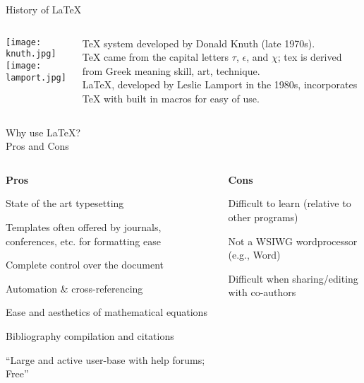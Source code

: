 \documentclass[xcolor=dvipsnames]{beamer}
\begin{document}
\begin{frame}{\LARGE{History of \LaTeX}}
\begin{columns}
\begin{column}{.25\textwidth}
	\texttt{[image: knuth.jpg]}\\
	\texttt{[image: lamport.jpg]}
\end{column}
\begin{column}{.8\textwidth}
	TeX system developed by Donald Knuth (late 1970s).\\
	TeX came from the capital letters $\tau$, $\epsilon$, and $\chi$; tex is derived from Greek meaning skill, art, technique.\\[2cm]
	LaTeX, developed by Leslie Lamport in the 1980s, incorporates TeX with built in macros for easy of use.
\end{column}
\end{columns}
\end{frame}


\begin{frame}{\LARGE{Why use \LaTeX ?}\\\Large{Pros and Cons}}
\begin{columns}[t]
\begin{column}{.6\textwidth}
\textbf{\Large{Pros}}
\begin{enumerate}
	{\small
		\item State of the art typesetting 
		\item Templates often offered by journals, conferences, etc. for formatting ease
		\item Complete control over the document
		\item Automation \& cross-referencing
		\item Ease and aesthetics of mathematical equations
		\item Bibliography compilation and citations
		\item ``Large and active user-base with help forums; Free''}
\end{enumerate}
\end{column}
\begin{column}{.5\textwidth}
\textbf{\Large{Cons}}
\begin{enumerate}
	{\small
		\item Difficult to learn (relative to other programs)
		\item Not a WSIWG wordprocessor (e.g., Word)
		\item Difficult when sharing/editing with co-authors}
\end{enumerate}
\end{column}
\end{columns}
\end{frame}
\end{document}
